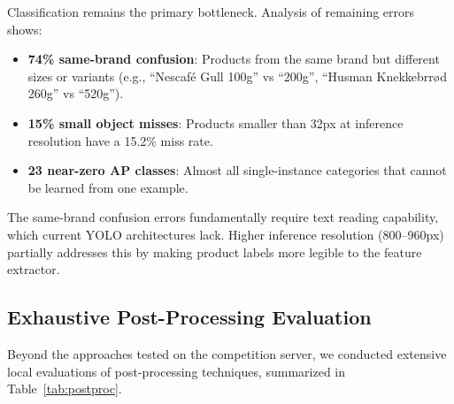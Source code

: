 \documentclass[11pt,a4paper]{article}
\begin{document}
Classification remains the primary bottleneck. Analysis of remaining errors shows:
\begin{itemize}
    \item \textbf{74\% same-brand confusion}: Products from the same brand but different sizes or variants (e.g., ``Nescaf\'e Gull 100g'' vs ``200g'', ``Husman Knekkebrr{\o}d 260g'' vs ``520g'').
    \item \textbf{15\% small object misses}: Products smaller than 32px at inference resolution have a 15.2\% miss rate.
    \item \textbf{23 near-zero AP classes}: Almost all single-instance categories that cannot be learned from one example.
\end{itemize}

The same-brand confusion errors fundamentally require text reading capability, which current YOLO architectures lack. Higher inference resolution (800--960px) partially addresses this by making product labels more legible to the feature extractor.

\subsection{Exhaustive Post-Processing Evaluation}

Beyond the approaches tested on the competition server, we conducted extensive local evaluations of post-processing techniques, summarized in Table~\ref{tab:postproc}.
\end{document}
